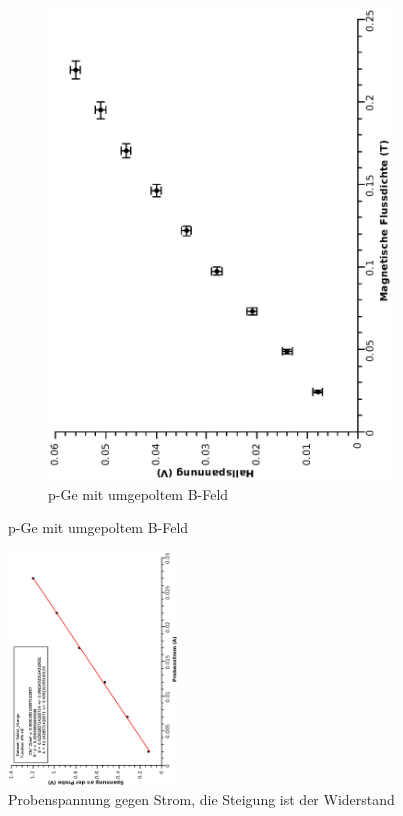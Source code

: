 \documentclass[12pt,a4paper,twopage]{article}
\begin{document}
\begin{figure}[H]
\begin{subfigure}{0.4\textwidth}
\includegraphics[width=0.9\linewidth, angle=-90]{ppeumpol.eps}
\caption{p-Ge mit umgepoltem B-Feld}
\end{subfigure}
\end{figure}


\begin{figure}[H]
\begin{center}
\includegraphics[width=0.4\textwidth, angle=-90]{widerstand.eps}
\caption{Probenspannung gegen Strom, die Steigung ist der Widerstand }
\end{center}
\end{figure}
\end{document}

